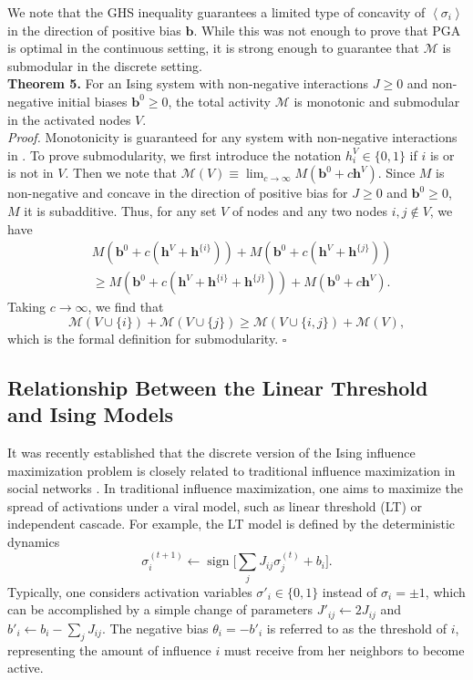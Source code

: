 \documentclass[letterpaper]{article} %
\DeclareMathOperator{\sign}{sign}
\begin{document}
We note that the GHS inequality guarantees a limited type of concavity of $\left<\sigma_i\right>$ in the direction of positive bias $\bm{b}$. While this was not enough to prove that PGA is optimal in the continuous setting, it is strong enough to guarantee that $\mathcal{M}$ is submodular in the discrete setting. \\

\noindent \textbf{Theorem 5.} For an Ising system with non-negative interactions $J\ge 0$ and non-negative initial biases $\bm{b}^{0}\ge 0$, the total activity $\mathcal{M}$ is monotonic and submodular in the activated nodes $V$. \\

\noindent \textit{Proof.} Monotonicity is guaranteed for any system with non-negative interactions in \cite{Griffiths-03}. To prove submodularity, we first introduce the notation $h_i^V \in \{0,1\}$ if $i$ is or is not in $V$. Then we note that $\mathcal{M}(V) \equiv\lim_{c\rightarrow\infty} M(\bm{b}^0 + c\bm{h}^V)$. Since $M$ is non-negative and concave in the direction of positive bias for $J\ge 0$ and $\bm{b}^0\ge 0$, $M$ it is subadditive. Thus, for any set $V$ of nodes and any two nodes $i,j\notin V$, we have
\begin{align}
&M(\bm{b}^0 + c(\bm{h}^V + \bm{h}^{\{i\}})) + M(\bm{b}^0 + c(\bm{h}^V + \bm{h}^{\{j\}})) \nonumber \\
&\ge M(\bm{b}^0 + c(\bm{h}^V + \bm{h}^{\{i\}} + \bm{h}^{\{j\}})) + M(\bm{b}^0 + c\bm{h}^V).
\end{align}
Taking $c\rightarrow\infty$, we find that
\begin{equation}
\mathcal{M}(V\cup \{i\}) + \mathcal{M}(V\cup \{j\}) \ge \mathcal{M}(V\cup \{i,j\}) + \mathcal{M}(V),
\end{equation}
which is the formal definition for submodularity.
\hfill $\square$

\subsection{Relationship Between the Linear Threshold and Ising Models}

It was recently established that the discrete version of the Ising influence maximization problem is closely related to traditional influence maximization in social networks \cite{Lynn-02}. In traditional influence maximization, one aims to maximize the spread of activations under a viral model, such as linear threshold (LT) or independent cascade. For example, the LT model is defined by the deterministic dynamics
\begin{equation}
\label{LT}
\sigma_i^{(t+1)} \leftarrow \sign\Big[\sum_j J_{ij}\sigma_j^{(t)} + b_i\Big].
\end{equation}
Typically, one considers activation variables $\sigma'_i\in \{0,1\}$ instead of $\sigma_i=\pm1$, which can be accomplished by a simple change of parameters $J'_{ij}\leftarrow 2J_{ij}$ and $b'_i \leftarrow b_i - \sum_jJ_{ij}$. The negative bias $\theta_i = -b'_i$ is referred to as the threshold of $i$, representing the amount of influence $i$ must receive from her neighbors to become active.
\end{document}
